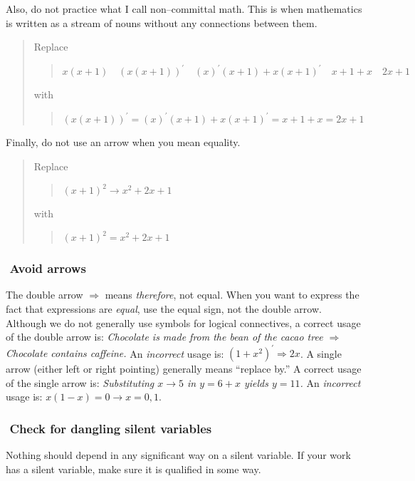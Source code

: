\documentclass[12pt,fleqn]{article}
\newcounter{ex}\setcounter{ex}{0}
\newcommand{\ex}{%
\hspace{-0.2in} \setcounter{ex}{\value{ex}+1}
\theex \,\,}
\newcounter{id}\setcounter{id}{0}
\newcounter{se}\setcounter{se}{0}
\begin{document}
\noindent Also, do not practice what I call non--committal math. This is
when mathematics is written as a stream of nouns without any 
connections between them.

\begin{quote}
Replace
\begin{quote}
  \( x (x + 1) \quad (x (x + 1))^\prime \quad (x)^\prime (x + 1) + x (x+1)^\prime
 \quad x + 1 + x \quad 2x + 1 \)
\end{quote}
with
\begin{quote}
   \((x (x + 1))^\prime = (x)^\prime (x + 1) + x (x+1)^\prime =  x + 1 + x = 2x + 1 \)
\end{quote}
\end{quote}

Finally, do not use an arrow when you mean equality.

\begin{quote}
Replace
\begin{quote}
  \( (x+1)^2 \rightarrow x^2 + 2 x + 1 \)
\end{quote}
with
\begin{quote}
   \( (x+1)^2 = x^2 + 2 x + 1 \)
\end{quote}
\end{quote}

\subsubsection*{\ex Avoid arrows}
The double arrow \(\Rightarrow\) means \emph{therefore}, not
equal. When you want to express the fact that expressions are
\emph{equal}, use the equal sign, not the double arrow. Although we do
not generally use symbols for logical connectives, a correct usage of
the double arrow is: \emph{Chocolate is made from the bean of the
cacao tree \(\Rightarrow\) Chocolate contains caffeine.}  An
\emph{incorrect} usage is: \(\left(1 + x^2\right)^\prime \Rightarrow 2
x\).  A single arrow (either left or right pointing) generally means
``replace by.''  A correct usage of the single arrow is:
\emph{Substituting \(x \to 5\) in \(y = 6 + x\) yields \(y = 11\).} An
\emph{incorrect} usage is: \(x (1-x) = 0 \to x = 0,1\).



\subsubsection*{\ex Check for dangling silent variables}

Nothing should depend in any significant way on a  silent variable. If your
work has a  silent variable, make sure it is qualified in some way.
\end{document}
